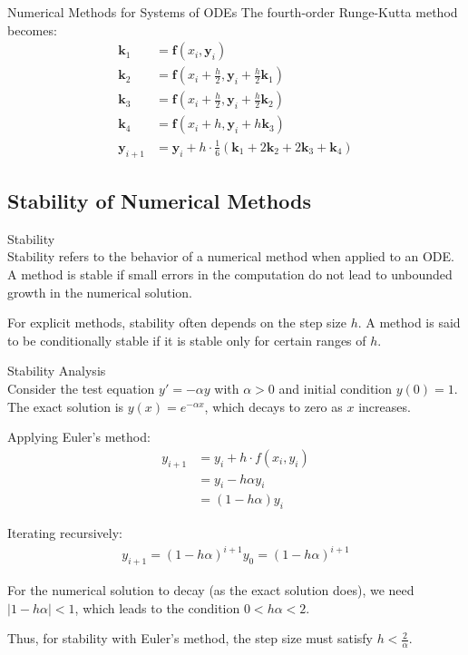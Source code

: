 \begin{KR}{Numerical Methods for Systems of ODEs}
The fourth-order Runge-Kutta method becomes:
\begin{align*}
\mathbf{k}_1 &= \mathbf{f}(x_i, \mathbf{y}_i)\\
\mathbf{k}_2 &= \mathbf{f}\left(x_i + \frac{h}{2}, \mathbf{y}_i + \frac{h}{2}\mathbf{k}_1\right)\\
\mathbf{k}_3 &= \mathbf{f}\left(x_i + \frac{h}{2}, \mathbf{y}_i + \frac{h}{2}\mathbf{k}_2\right)\\
\mathbf{k}_4 &= \mathbf{f}(x_i + h, \mathbf{y}_i + h\mathbf{k}_3)\\
\mathbf{y}_{i+1} &= \mathbf{y}_i + h \cdot \frac{1}{6}(\mathbf{k}_1 + 2\mathbf{k}_2 + 2\mathbf{k}_3 + \mathbf{k}_4)
\end{align*}
\end{KR}

\subsection{Stability of Numerical Methods}

\begin{definition}{Stability}\\
Stability refers to the behavior of a numerical method when applied to an ODE. A method is stable if small errors in the computation do not lead to unbounded growth in the numerical solution.

For explicit methods, stability often depends on the step size $h$. A method is said to be conditionally stable if it is stable only for certain ranges of $h$.
\end{definition}

\begin{example2}{Stability Analysis}\\
Consider the test equation $y' = -\alpha y$ with $\alpha > 0$ and initial condition $y(0) = 1$. The exact solution is $y(x) = e^{-\alpha x}$, which decays to zero as $x$ increases.

Applying Euler's method:
\begin{align*}
y_{i+1} &= y_i + h \cdot f(x_i, y_i)\\
&= y_i - h\alpha y_i\\
&= (1 - h\alpha)y_i
\end{align*}

Iterating recursively:
\begin{align*}
y_{i+1} = (1 - h\alpha)^{i+1}y_0 = (1 - h\alpha)^{i+1}
\end{align*}

For the numerical solution to decay (as the exact solution does), we need $|1 - h\alpha| < 1$, which leads to the condition $0 < h\alpha < 2$.

Thus, for stability with Euler's method, the step size must satisfy $h < \frac{2}{\alpha}$.
\end{example2}

